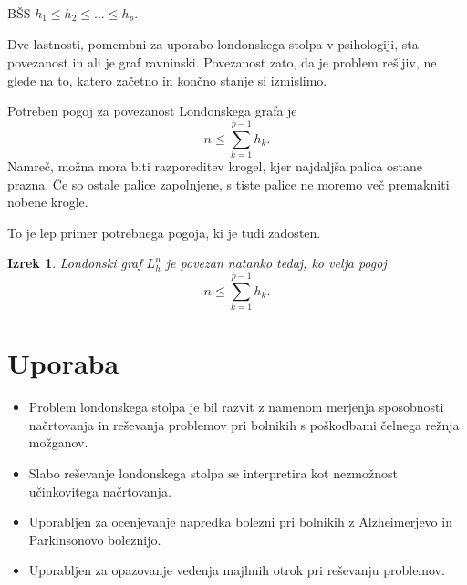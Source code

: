 \documentclass[11pt]{article}
\theoremstyle{definition} %
\theoremstyle{plain} %
\newtheorem{izrek}[definicija]{Izrek}
\begin{document}
BŠS $h_1 \leq h_2 \leq \ldots \leq h_p$.

Dve lastnosti, pomembni za uporabo londonskega stolpa v psihologiji, sta povezanost in ali je graf ravninski.
Povezanost zato, da je problem rešljiv, ne glede na to, katero začetno in končno stanje si izmislimo.

Potreben pogoj za povezanost Londonskega grafa je 
\[ n \leq \sum_{k=1}^{p-1} h_k. \]
Namreč, možna mora biti razporeditev krogel, kjer najdaljša palica ostane prazna. Če so ostale palice zapolnjene, s tiste palice ne moremo več premakniti nobene krogle. 

To je lep primer potrebnega pogoja, ki je tudi zadosten.
\begin{izrek}
Londonski graf $L_h^n$ je povezan natanko tedaj, ko velja pogoj
\[ n \leq \sum_{k=1}^{p-1} h_k. \]
\end{izrek}


\section{Uporaba}
\begin{itemize}
    \item Problem londonskega stolpa je bil razvit z namenom merjenja sposobnosti načrtovanja in reševanja problemov pri bolnikih s poškodbami čelnega režnja možganov.
    \item Slabo reševanje londonskega stolpa se interpretira kot nezmožnost učinkovitega načrtovanja.
    \item Uporabljen za ocenjevanje napredka bolezni pri bolnikih z Alzheimerjevo in Parkinsonovo boleznijo.
    \item Uporabljen za opazovanje vedenja majhnih otrok pri reševanju problemov.
\end{itemize}
\end{document}

